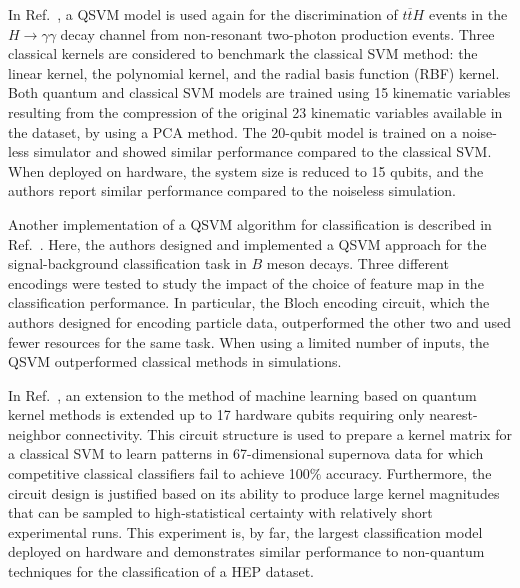 In Ref.~\cite{2021WuSunGuan}, a QSVM model is used again for the discrimination of $t\overline{t}H$ events in the $H\rightarrow \gamma\gamma$ decay channel from non-resonant two-photon production events.
Three classical kernels are considered to benchmark the classical SVM method: the linear kernel, the polynomial kernel, and the radial basis function (RBF) kernel.
Both quantum and classical SVM models are trained using 15 kinematic variables resulting from the compression of the original 23 kinematic variables available in the dataset, by using a PCA method.
The 20-qubit model is trained on a noise-less simulator and showed similar performance compared to the classical SVM. 
When deployed on hardware, the system size is reduced to 15 qubits, and the authors report similar performance compared to the noiseless simulation. 

Another implementation of a QSVM algorithm for classification is described in Ref.~\cite{Heredge2021}.
Here, the authors designed and implemented a QSVM approach for the signal-background classification task in $B$ meson decays.
Three different encodings were tested to study the impact of the choice of feature map in the classification performance.
In particular, the Bloch encoding circuit, which the authors designed for encoding particle data, outperformed the other two and used fewer resources for the same task.
When using a limited number of inputs, the QSVM outperformed classical methods in simulations.  

In Ref.~\cite{Peters2021}, an extension to the method of machine learning based on quantum kernel methods is extended up to 17 hardware qubits requiring only nearest-neighbor connectivity.
This circuit structure is used to prepare a kernel matrix for a classical SVM to learn patterns in 67-dimensional supernova data for which competitive classical classifiers fail to achieve 100$\%$ accuracy.
Furthermore, the circuit design is justified based on its ability to produce large kernel magnitudes that can be sampled to high-statistical certainty with relatively short experimental runs.
This experiment is, by far, the largest classification model deployed on hardware and demonstrates similar performance to non-quantum techniques for the classification of a HEP dataset.

